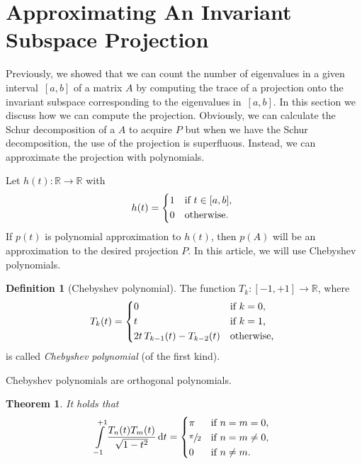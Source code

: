\documentclass[%
	paper=a4,
	fontsize=10pt,
	DIV11,BCOR10mm,
	numbers=noenddot,
	abstract=yes
]{scrartcl}
\newcommand{\R}{\mathbb{R}}
\newtheorem{theorem}{Theorem}[section]
\theoremstyle{definition}
\newtheorem{definition}{Definition}[section]
\begin{document}
\section{Approximating An Invariant Subspace Projection}

Previously, we showed that we can count the number of eigenvalues in a given
interval~$[a, b]$ of a matrix $A$ by computing the trace of a projection onto
the invariant subspace corresponding to the eigenvalues in~$[a, b]$. In this
section we discuss how we can compute the projection. Obviously, we can
calculate the Schur decomposition of a $A$ to acquire $P$ but when we have the
Schur decomposition, the use of the projection is superfluous. Instead, we can
approximate the projection with polynomials.

Let $h(t): \R \rightarrow \R$ with
\[
	h(t) =
	\begin{dcases*}
		1 & if $t \in [a, b]$, \\
		0 & otherwise.
	\end{dcases*}
\]
If $p(t)$ is polynomial approximation to $h(t)$, then $p(A)$ will be an
approximation to the desired projection $P$. In this article, we will use
Chebyshev polynomials.

\begin{definition}[Chebyshev polynomial]
	The function $T_k: [-1, +1] \rightarrow \R$, where
	\[
		T_k(t) =
		\begin{dcases*}
			0 & if $k = 0$, \\
			t & if $k = 1$, \\
			2 t \, T_{k-1}(t) - T_{k-2}(t) & otherwise,
		\end{dcases*}
	\]
	is called \emph{Chebyshev polynomial} (of the first kind).
\end{definition}

Chebyshev polynomials are orthogonal polynomials.

\begin{theorem}
	It holds that
	\[
		\int\limits_{-1}^{+1} \frac{T_n(t) T_m(t)}{\sqrt{1 - t^2}}\,\mathrm{d}t=
		\begin{dcases*}
			\pi & if $n = m = 0$, \\
			\sfrac{\pi}{2} & if $n = m \neq 0$, \\
			0 & if $n \neq m$.
		\end{dcases*}
	\]
\end{theorem}
\end{document}
